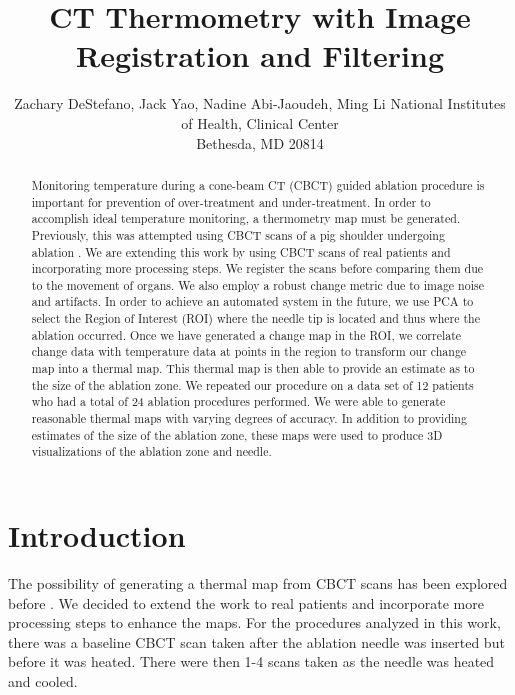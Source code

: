 \documentclass[]{spie}  %
\title{CT Thermometry with Image Registration and Filtering}
\author{Zachary DeStefano\supit{a}, Jack Yao\supit{a}, Nadine Abi-Jaoudeh\supit{a}, Ming Li\supit{a}
\skiplinehalf
\supit{a}National Institutes of Health, Clinical Center\\Bethesda, MD 20814
}
\begin{document}
 
  \maketitle 

\begin{abstract}
Monitoring temperature during a cone-beam CT (CBCT) guided ablation procedure is important for prevention of over-treatment and under-treatment. In order to accomplish ideal temperature monitoring, a thermometry map must be generated.  Previously, this was attempted using CBCT scans of a pig shoulder undergoing ablation \cite{Li13}. We are extending this work by using CBCT scans of real patients and incorporating more processing steps. We register the scans before comparing them due to the movement of organs. We also employ a robust change metric due to image noise and artifacts. In order to achieve an automated system in the future, we use PCA to select the Region of Interest (ROI) where the needle tip is located and thus where the ablation occurred. Once we have generated a change map in the ROI, we correlate change data with temperature data at points in the region to transform our change map into a thermal map. This thermal map is then able to provide an estimate as to the size of the ablation zone. We repeated our procedure on a data set of 12 patients who had a total of 24 ablation procedures performed. We were able to generate reasonable thermal maps with varying degrees of accuracy. In addition to providing estimates of the size of the ablation zone, these maps were used to produce 3D visualizations of the ablation zone and needle.  
\end{abstract}



\section{Introduction}
\label{sec:intro}  %

The possibility of generating a thermal map from CBCT scans has been explored before \cite{Li13}. We decided to extend the work to real patients and incorporate more processing steps to enhance the maps. For the procedures analyzed in this work, there was a baseline CBCT scan taken after the ablation needle was inserted but before it was heated. There were then 1-4 scans taken as the needle was heated and cooled.
\end{document}
